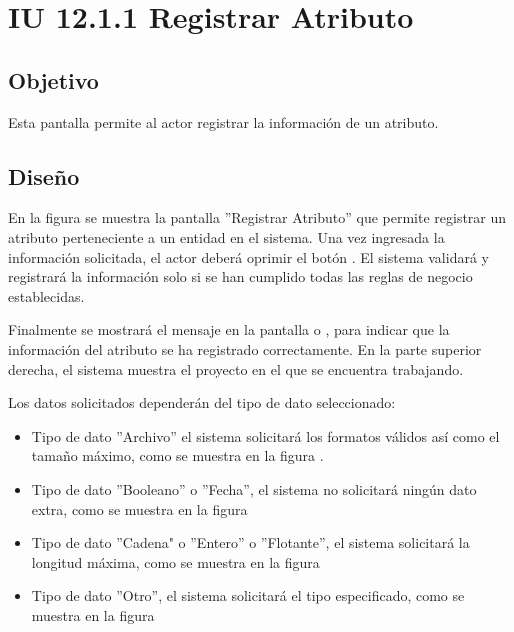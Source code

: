 \section{IU 12.1.1 Registrar Atributo}

\subsection{Objetivo}
	Esta pantalla permite al actor registrar la información de un atributo.
\subsection{Diseño}
	En la figura  se muestra la pantalla ''Registrar Atributo'' que permite registrar un atributo perteneciente a un entidad en el sistema.
	Una vez ingresada la información solicitada, el actor deberá oprimir el botón  . El sistema validará y registrará la información solo si se han cumplido todas las reglas de negocio establecidas.
	
	Finalmente se mostrará el mensaje  en la pantalla  o , para indicar que la información del atributo se ha registrado correctamente.
	En la parte superior derecha, el sistema muestra el proyecto en el que se encuentra trabajando.
	
	
	Los datos solicitados dependerán del tipo de dato seleccionado:
	\begin{itemize}
		\item Tipo de dato ''Archivo'' el sistema solicitará los formatos válidos así como el tamaño máximo, como se muestra en la figura .
		\item Tipo de dato ''Booleano'' o ''Fecha'', el sistema no solicitará ningún dato extra, como se muestra en la figura 
		\item Tipo de dato ''Cadena" o ''Entero'' o ''Flotante'', el sistema solicitará la longitud máxima, como se muestra en la figura 
		\item Tipo de dato ''Otro'', el sistema solicitará el tipo especificado, como se muestra en la figura 
	\end{itemize}

